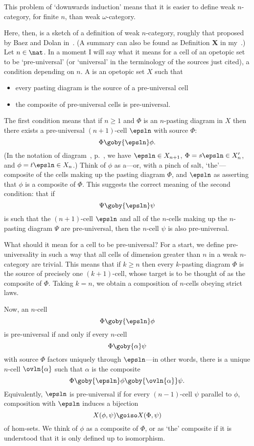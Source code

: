 This problem of `downwards induction' means that it is easier to define
weak $n$-category, for finite $n$, than weak $\omega$-category.

Here, then, is a sketch of a definition of weak $n$-category, roughly that
proposed by Baez%
%
%
and Dolan%
%
%
in~\cite{BDHDA3}.  (A summary can also be found
as Definition \textbf{X} in my~\cite{SDN}.)  Let $n\in\nat$.  In a moment I
will say what it means for a cell of an opetopic set to be `pre-universal'
(or `universal'%
%
%
in the terminology of the sources just cited), a condition
depending on $n$.  A %
%
%
is an opetopic set $X$ such
that
%
\begin{itemize}
\item every pasting diagram is the source of a pre-universal cell
\item the composite of pre-universal cells is pre-universal.
\end{itemize}
%
The first condition means that if $n\geq 1$ and $\Phi$ is an $n$-pasting
diagram in $X$ then there exists a pre-universal $(n+1)$-cell $\epsln$ with
source $\Phi$:
\[
\Phi \goby{\epsln} \phi.
\]
(In the notation of diagram~,
p.~\pageref{diag:ope-set-comm}, we have $\epsln\in X_{n+1}$, $\Phi =
s\epsln \in X'_n$, and $\phi = t\epsln \in X_n$.)  Think of $\phi$ as
a---or, with a pinch of salt, `the'---composite of the cells making up the
pasting diagram $\Phi$, and $\epsln$ as asserting that $\phi$ is a
composite of $\Phi$.  This suggests the correct meaning of the second
condition: that if
\[
\Psi \goby{\epsln} \psi
\]
is such that the $(n+1)$-cell $\epsln$ and all of the $n$-cells making up
the $n$-pasting diagram $\Psi$ are pre-universal, then the $n$-cell $\psi$
is also pre-universal.

What should it mean for a cell to be pre-universal?%
%
%
 For a start, we define
pre-universality in such a way that all cells of dimension greater than $n$
in a weak $n$-category are trivial.  This means that if $k\geq n$ then
every $k$-pasting diagram $\Phi$ is the source of precisely one
$(k+1)$-cell, whose target is to be thought of as the composite of $\Phi$.
Taking $k=n$, we obtain a composition of $n$-cells obeying strict laws.

Now, an $n$-cell
\[
\Phi \goby{\epsln} \phi
\]
is pre-universal if and only if every $n$-cell
\[
\Phi \goby{\alpha} \psi
\]
with source $\Phi$ factors uniquely through $\epsln$---in other words,
there is a unique $n$-cell $\ovln{\alpha}$ such that $\alpha$ is the
composite
\[
\Phi \goby{\epsln} \phi \goby{\ovln{\alpha}} \psi.
\]
Equivalently, $\epsln$ is pre-universal if for every $(n-1)$-cell $\psi$
parallel to $\phi$, composition with $\epsln$ induces a bijection
%
\begin{equation}	\label{eq:hom-sets-bjn}
X(\phi,\psi) \goiso X(\Phi,\psi)
\end{equation}
% 
of hom-sets.  We think of $\phi$ as a composite of $\Phi$, or as `the'
composite if it is understood that it is only defined up to isomorphism.

